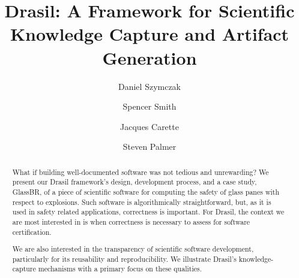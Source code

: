 \documentclass[sigconf]{acmart}
\begin{document}
\title[Drasil Framework]{Drasil: A Framework for Scientific Knowledge Capture and Artifact Generation}

\author{Daniel Szymczak}

\author{Spencer Smith}

\author{Jacques Carette}

\author{Steven Palmer}


\begin{abstract}
	
What if building well-documented software was not tedious and unrewarding?  We
present our Drasil framework's design, development process, and a case study,
GlassBR, of a piece of scientific software for computing the safety of glass
panes with respect to explosions. Such software is algorithmically
straightforward, but, as it is used in safety related applications, correctness
is important. For Drasil, the context we are most interested in is when correctness is
necessary to assess for software certification.

We are also interested in the transparency of scientific software development,
particularly for its reusability and reproducibility. We illustrate Drasil's 
knowledge-capture mechanisms with a primary focus on these qualities.

\end{abstract}
\end{document}
